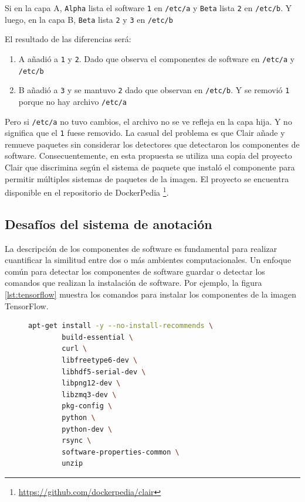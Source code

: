 Si en la capa A, \texttt{Alpha} lista el software \verb|1| en  \verb|/etc/a| y \texttt{Beta} lista \verb|2| en  \verb|/etc/b|. Y luego, en la capa B, \texttt{Beta}  lista \verb|2| y \verb|3| en  \verb|/etc/b|

El resultado de las diferencias será: 

\begin{enumerate}
	\item A añadió a \verb|1| y \verb|2|. Dado que observa el componentes de software en \verb|/etc/a| y \verb|/etc/b|
	\item  B añadió a \verb|3| y se mantuvo \verb|2| dado que observan en \verb|/etc/b|. Y se removió \verb|1| porque no hay archivo \verb|/etc/a|
\end{enumerate}

Pero si \verb|/etc/a| no tuvo cambios, el archivo no se ve refleja en la capa hija. Y no significa que el \verb|1| fuese removido. 
La casual del problema es que Clair añade y remueve paquetes sin considerar los detectores que detectaron los componentes de software. 
Consecuentemente, en esta propuesta se utiliza una copia del proyecto Clair que discrimina según el sistema de paquete que instaló el componente para permitir múltiples sistemas de paquetes de la imagen. El proyecto se encuentra disponible en el repositorio de DockerPedia \footnote{\url{https://github.com/dockerpedia/clair}}.
\subsection{Desafíos del sistema de anotación}\label{s4.2.3}

La descripción de los componentes de software es fundamental para realizar cuantificar la similitud entre dos o más ambientes computacionales.
Un enfoque común para detectar los componentes de software guardar o detectar los comandos que realizan la instalación de software. Por ejemplo, la figura \ref{lst:tensorflow} muestra los comandos para instalar los componentes de la imagen TensorFlow. 
\begin{figure}
	\begin{lstlisting}[caption={Ejemplo de instalación de dependencias para la imagen TensorFlow},label={lst:tensorflow},language=bash]
apt-get install -y --no-install-recommends \
        build-essential \
        curl \
        libfreetype6-dev \
        libhdf5-serial-dev \
        libpng12-dev \
        libzmq3-dev \
        pkg-config \
        python \
        python-dev \
        rsync \
        software-properties-common \
        unzip	
\end{lstlisting}

\end{figure}

